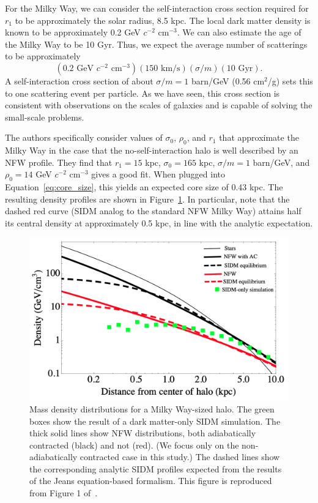 For the Milky Way, we can consider the self-interaction cross section required
for $r_1$ to be approximately the solar radius, 8.5 kpc. The local dark matter
density is known to be approximately 0.2 GeV $c^{-2}$ cm$^{-3}$. We can also
estimate the age of the Milky Way to be 10 Gyr. Thus, we expect the average
number of scatterings to be approximately
\begin{equation}
    \left( 0.2 \text{ GeV $c^{-2}$ cm$^{-3}$} \right)
    \left( 150 \text{ km/s} \right)
    \left( \sigma/m \right)
    \left( 10 \text{ Gyr} \right).
\end{equation}
A self-interaction cross section of about $\sigma/m = 1$ barn/GeV (0.56
cm$^2$/g) sets this to one scattering event per particle. As we have seen, this
cross section is consistent with observations on the scales of galaxies and is
capable of solving the small-scale problems.

The authors specifically consider values of $\sigma_0$, $\rho_0$, and $r_1$
that approximate the Milky Way in the case that the no-self-interaction halo is
well described by an NFW profile. They find that $r_1 = 15$ kpc, $\sigma_0 =
165$ kpc, $\sigma / m = 1$ barn/GeV, and $\rho_0 = 14$ GeV $c^{-2}$ cm$^{-3}$
gives a good fit. When plugged into Equation~\ref{eq:core_size}, this yields an
expected core size of 0.43 kpc. The resulting density profiles are shown in
Figure~\ref{fig:sidm_expected_density}. In particular, note that the dashed red
curve (SIDM analog to the standard NFW Milky Way) attains half its central
density at approximately 0.5 kpc, in line with the analytic expectation.

\begin{figure}
    \centering
    \includegraphics[width=0.65\linewidth]{figs/kaplinghat_sidm_density.png}
    \caption{%
        Mass density distributions for a Milky Way-sized halo. The green boxes
        show the result of a dark matter-only SIDM simulation. The thick solid
        lines show NFW distributions, both adiabatically contracted (black)
        and not (red). (We focus only on the non-adiabatically contracted case
        in this study.) The dashed lines show the corresponding analytic SIDM
        profiles expected from the results of the Jeans equation-based
        formalism. This figure is reproduced from Figure 1
        of~\cite{kaplinghat_tying_2014}.
    }
    \label{fig:sidm_expected_density}
\end{figure}


